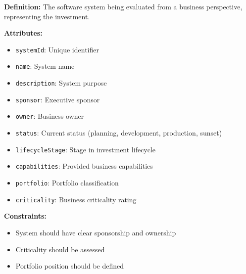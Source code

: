 \documentclass[11pt,letterpaper]{article}
\begin{document}
\begin{definitionbox}
\textbf{Definition:} The software system being evaluated from a business perspective, representing the investment.

\textbf{Attributes:}
\begin{itemize}[nosep]
    \item \texttt{systemId}: Unique identifier
    \item \texttt{name}: System name
    \item \texttt{description}: System purpose
    \item \texttt{sponsor}: Executive sponsor
    \item \texttt{owner}: Business owner
    \item \texttt{status}: Current status (planning, development, production, sunset)
    \item \texttt{lifecycleStage}: Stage in investment lifecycle
    \item \texttt{capabilities}: Provided business capabilities
    \item \texttt{portfolio}: Portfolio classification
    \item \texttt{criticality}: Business criticality rating
\end{itemize}

\textbf{Constraints:}
\begin{itemize}[nosep]
    \item System should have clear sponsorship and ownership
    \item Criticality should be assessed
    \item Portfolio position should be defined
\end{itemize}
\end{definitionbox}
\end{document}
